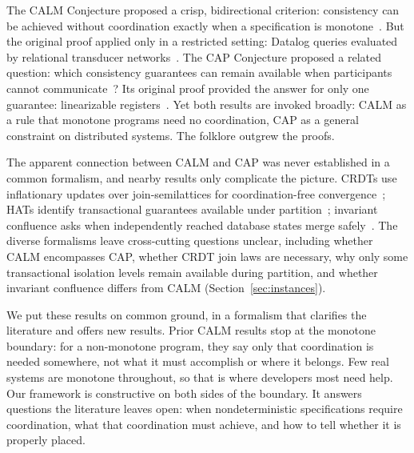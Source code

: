 \documentclass[sigconf]{cidr-2027}
\theoremstyle{remark}
\begin{document}
\textcolor{reviewed}{The CALM Conjecture proposed a crisp, bidirectional criterion:
consistency can be achieved without coordination exactly when a specification
is monotone~\cite{hellerstein2010declarative}.} \textcolor{reviewed}{But the original proof applied
only in a restricted setting: Datalog queries evaluated by relational transducer
networks~\cite{ameloot2013relational,hellerstein2020keeping}.} \textcolor{reviewed}{The CAP
Conjecture proposed a related question: which consistency guarantees can remain
available when participants cannot
communicate~\cite{brewer2000towards,brewer2012cap}?} \textcolor{reviewed}{Its original proof
provided the answer for only one guarantee: linearizable
registers~\cite{gilbert2002cap}.} \textcolor{reviewed}{Yet both results are invoked broadly: CALM as a
rule that monotone programs need no coordination, CAP as a general constraint
on distributed systems.} \textcolor{reviewed}{The folklore outgrew the proofs.}

\textcolor{reviewed}{The apparent connection between CALM and CAP was never established in a common
formalism, and nearby results only complicate the picture.} \textcolor{reviewed}{CRDTs use
inflationary updates over join-semilattices for coordination-free
convergence~\cite{shapiro2011crdt}; HATs identify transactional guarantees
available under partition~\cite{bailis2013hat}; invariant confluence asks when
independently reached database states merge
safely~\cite{bailis2014coordination}.} \textcolor{reviewed}{The diverse formalisms leave cross-cutting
questions unclear, including whether CALM encompasses CAP, whether CRDT join
laws are necessary, why only some transactional isolation levels remain
available during partition, and whether invariant confluence differs from CALM
(Section~\ref{sec:instances}).}

\textcolor{reviewed}{We put these results on common ground, in a formalism that clarifies the
literature and offers new results.} \textcolor{reviewed}{Prior CALM results stop at the monotone
boundary: for a non-monotone program, they say only that coordination is needed
somewhere, not what it must accomplish or where it belongs.} \textcolor{reviewed}{Few real systems
are monotone throughout, so that is where developers most need help.} \textcolor{reviewed}{Our
framework is constructive on both sides of the boundary.} \textcolor{reviewed}{It answers questions
the literature leaves open: when nondeterministic specifications require
coordination, what that coordination must achieve, and how to tell whether it is
properly placed.}
\end{document}

